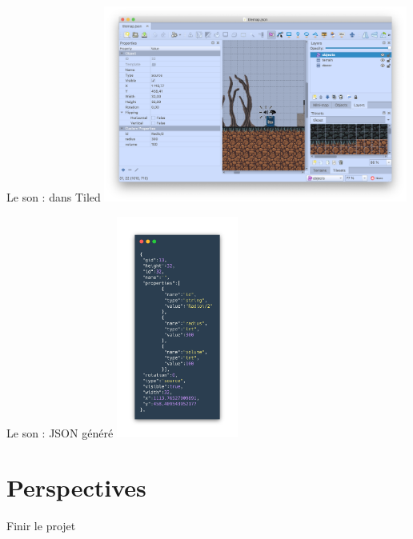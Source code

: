 \documentclass{beamer}
\begin{document}
\begin{frame}{Le son : dans Tiled}
    \centering
    \includegraphics[width=10cm]{assets/tiledSon}
\end{frame}

\begin{frame}{Le son : JSON généré}
    \centering
    \includegraphics[width=4cm]{assets/jsonSource}
\end{frame}

\section{Perspectives}

\begin{frame}{Finir le projet}
  
\end{frame}
\end{document}

